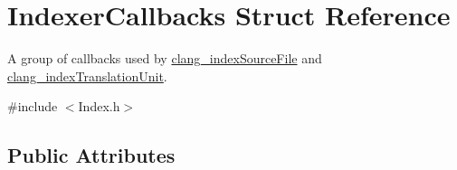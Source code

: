 \hypertarget{structIndexerCallbacks}{}\section{Indexer\+Callbacks Struct Reference}
\label{structIndexerCallbacks}


A group of callbacks used by \hyperlink{group__CINDEX__HIGH_gaa5c2ad8979779c401b91110d444e2be6}{clang\+\_\+index\+Source\+File} and \hyperlink{group__CINDEX__HIGH_gab12a0795c7d7be6e7ec85679faf3f8e9}{clang\+\_\+index\+Translation\+Unit}.  




{\ttfamily \#include $<$Index.\+h$>$}

\subsection*{Public Attributes}
